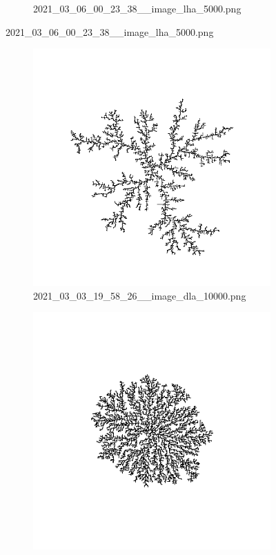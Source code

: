 \documentclass[12pt,a4paper]{scrartcl}
\newcommand{\1}{\mathbbm{1}}
\theoremstyle{definition}
\numberwithin{equation}{section}
\begin{document}
\begin{figure}[h!]
\begin{subfigure}[b]{.49\textwidth}
		\caption{2021\_03\_06\_00\_23\_38\_\_image\_lha\_5000.png}
	\end{subfigure}
\end{figure}

\begin{figure}[h!]
	\centering
	\begin{subfigure}[b]{.49\textwidth}
		\includegraphics[width=1\linewidth]{images/ia/2021_03_03_19_58_26__image_dla_10000.png}
		\caption{2021\_03\_03\_19\_58\_26\_\_image\_dla\_10000.png}
	\end{subfigure}
	\begin{subfigure}[b]{.49\textwidth}
		\includegraphics[width=1\linewidth]{images/ia/2021_03_05_23_28_53__image_lha_10000.png}

\end{subfigure}
\end{figure}
\end{document}
